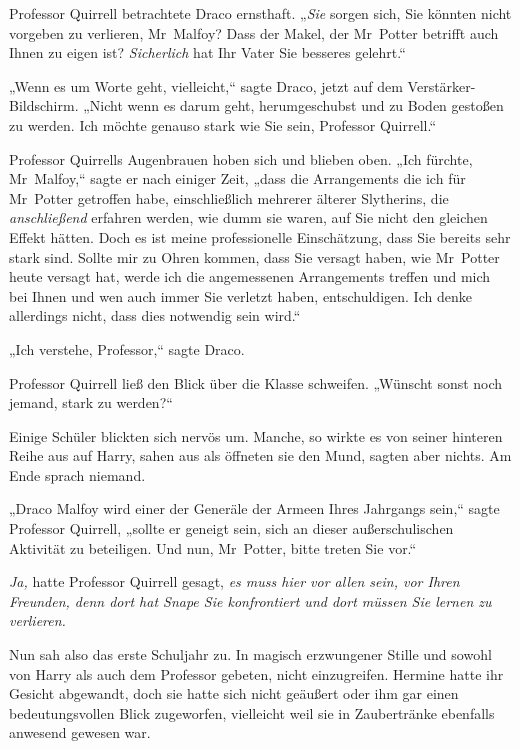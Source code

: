 {Professor Quirrell betrachtete Draco ernsthaft. „\emph{Sie} sorgen sich, Sie könnten nicht vorgeben zu verlieren, Mr~Malfoy? Dass der Makel, der Mr~Potter betrifft auch Ihnen zu eigen ist? \emph{Sicherlich} hat Ihr Vater Sie besseres gelehrt.“

„Wenn es um Worte geht, vielleicht,“ sagte Draco, jetzt auf dem Verstärker-Bildschirm. „Nicht wenn es darum geht, herumgeschubst und zu Boden gestoßen zu werden. Ich möchte genauso stark wie Sie sein, Professor Quirrell.“

Professor Quirrells Augenbrauen hoben sich und blieben oben. „Ich fürchte, Mr~Malfoy,“ sagte er nach einiger Zeit, „dass die Arrangements die ich für Mr~Potter getroffen habe, einschließlich mehrerer älterer Slytherins, die \emph{anschließend} erfahren werden, wie dumm sie waren, auf Sie nicht den gleichen Effekt hätten. Doch es ist meine professionelle Einschätzung, dass Sie bereits sehr stark sind. Sollte mir zu Ohren kommen, dass Sie versagt haben, wie Mr~Potter heute versagt hat, werde ich die angemessenen Arrangements treffen und mich bei Ihnen und wen auch immer Sie verletzt haben, entschuldigen. Ich denke allerdings nicht, dass dies notwendig sein wird.“

„Ich verstehe, Professor,“ sagte Draco.

Professor Quirrell ließ den Blick über die Klasse schweifen. „Wünscht sonst noch jemand, stark zu werden?“

Einige Schüler blickten sich nervös um. Manche, so wirkte es von seiner hinteren Reihe aus auf Harry, sahen aus als öffneten sie den Mund, sagten aber nichts. Am Ende sprach niemand.

„Draco Malfoy wird einer der Generäle der Armeen Ihres Jahrgangs sein,“ sagte Professor Quirrell, „sollte er geneigt sein, sich an dieser außerschulischen Aktivität zu beteiligen. Und nun, Mr~Potter, bitte treten Sie vor.“

\later

\emph{Ja,} hatte Professor Quirrell gesagt, \emph{es muss hier vor allen sein, vor Ihren Freunden, denn dort hat Snape Sie konfrontiert und dort müssen Sie lernen zu verlieren.}

Nun sah also das erste Schuljahr zu. In magisch erzwungener Stille und sowohl von Harry als auch dem Professor gebeten, nicht einzugreifen. Hermine hatte ihr Gesicht abgewandt, doch sie hatte sich nicht geäußert oder ihm gar einen bedeutungsvollen Blick zugeworfen, vielleicht weil sie in Zaubertränke ebenfalls anwesend gewesen war.

}
